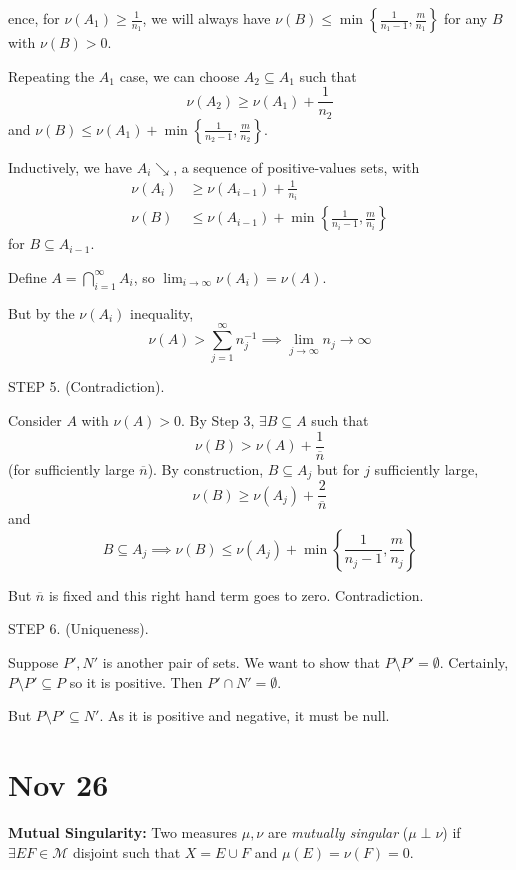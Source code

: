 \documentclass[12pt]{report}
\newcommand{\M}{\mathcal{M}}
\newcommand{\sub}{\subseteq}
\renewcommand{\bar}[1]{\overline{#1}}
\newcommand*{\tbf}[1]{\ifmmode\mathbf{#1}\else\textbf{#1}\fi}
\newenvironment*{tbox}[2][gray]{
    \begin{tcolorbox}[
        parbox=false,
        colback=#1!5!white,
        colframe=#1!75!black,
        breakable,
        title={#2}
    ]}
    {\end{tcolorbox}}
\begin{document}
\begin{tbox}
            Hence, for $\nu(A_1) \geq \frac{1}{n_1}$, we will always have $\nu(B) \leq \min\left\{\frac{1}{n_1 - 1}, \frac{m}{n_1}\right\}$ for any $B$ with $\nu(B) > 0$. 

            Repeating the $A_1$ case, we can choose $A_2 \sub A_1$ such that 
            \[\nu(A_2) \geq \nu(A_1) + \frac{1}{n_2}\]
            and $\nu(B) \leq \nu(A_1) + \min\left\{\frac{1}{n_2- 1}, \frac{m}{n_2}\right\}$. 

            Inductively, we have $A_i \searrow$, a sequence of positive-values sets, with 
            \begin{align*}
                \nu(A_i) &\geq \nu(A_{i-1}) + \frac{1}{n_i}\\ 
                \nu(B) &\leq \nu(A_{i-1}) + \min\left\{\frac{1}{n_i - 1}, \frac{m}{n_i}\right\}
            \end{align*}
            for $B \sub A_{i-1}$. 

            Define $A = \bigcap_{i=1}^\infty A_i$, so $\lim_{i \to \infty} \nu(A_i) = \nu(A)$.

            But by the $\nu(A_i)$ inequality, 
            \[\nu(A) > \sum_{j=1}^{\infty} n_j^{-1} \implies \lim_{j \to \infty} n_j \to \infty\]

            STEP 5. (Contradiction). 

            Consider $A$ with $\nu(A) > 0$. By Step 3, $\exists B \sub A$ such that 
            \[\nu(B) > \nu(A) + \frac{1}{\bar n}\] 
            (for sufficiently large $\bar n$). By construction, $B \sub A_{j}$ but for $j$ sufficiently large, 
            \[\nu(B) \geq \nu(A_j) + \frac{2}{\bar n}\]
            and 
            \[B \sub A_j \implies \nu(B) \leq \nu(A_j) + \min\left\{\frac{1}{n_j - 1}, \frac{m}{n_j}\right\}\]

            But $\bar n$ is fixed and this right hand term goes to zero. Contradiction. 

            STEP 6. (Uniqueness).

            Suppose $P', N'$ is another pair of sets. We want to show that $P \setminus P' = \emptyset$. Certainly, $P \setminus P' \sub P$ so it is positive. Then $P' \cap N' = \emptyset$. 

            But $P \setminus P' \sub N'$. As it is positive and negative, it must be null.
        \end{tbox}

\section{Nov 26}
    \tbf{Mutual Singularity:} Two measures $\mu, \nu$ are \emph{mutually singular} ($\mu \perp \nu$) if $\exists E F \in \M$ disjoint such that $X = E \cup F$ and $\mu(E) = \nu(F) = 0$.
\end{document}
